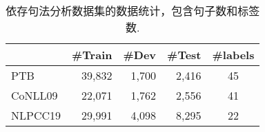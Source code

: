 \begin{table}[tb!]
    \centering
    \caption{依存句法分析数据集的数据统计，包含句子数和标签数.}
    \begin{tabular}{lrrr|c}
        \toprule
                & \#Train & \#Dev & \#Test & \#labels \\[1pt]
        \midrule
        PTB     & 39,832  & 1,700 & 2,416  & 45       \\
        CoNLL09 & 22,071  & 1,762 & 2,556  & 41       \\
        NLPCC19 & 29,991  & 4,098 & 8,295  & 22       \\
        \bottomrule
    \end{tabular}
    \label{table:dep-statistics}
\end{table}